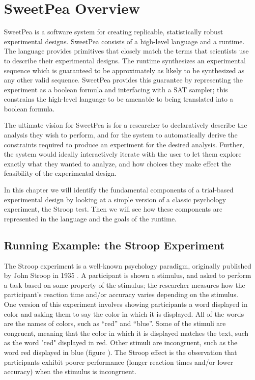 
\chapter{SweetPea Overview}

SweetPea is a software system for creating replicable, statistically robust experimental designs. SweetPea consists of a high-level language and a runtime. The language provides primitives that closely match the terms that scientists use to describe their experimental designs. The runtime synthesizes an experimental sequence which is guaranteed to be approximately as likely to be synthesized as any other valid sequence. SweetPea provides this guarantee by representing the experiment as a boolean formula and interfacing with a SAT sampler; this constrains the high-level language to be amenable to being translated into a boolean formula.

The ultimate vision for SweetPea is for a researcher to declaratively describe the analysis they wish to perform, and for the system to automatically derive the constraints required to produce an experiment for the desired analysis. Further, the system would ideally interactively iterate with the user to let them explore exactly what they wanted to analyze, and how choices they make effect the feasibility of the experimental design.

In this chapter we will identify the fundamental components of a trial-based experimental design by looking at a simple version of a classic psychology experiment, the Stroop test. Then we will see how these components are represented in the language and the goals of the runtime.

\section{Running Example: the Stroop Experiment}

The Stroop experiment is a well-known psychology paradigm, originally published by John Stroop in 1935 \cite{stroop1935studies}. A participant is shown a stimulus, and asked to perform a task based on some property of the stimulus; the researcher measures how the participant's reaction time and/or accuracy varies depending on the stimulus. One version of this experiment involves showing participants a word displayed in color and asking them to say the color in which it is displayed. All of the words are the names of colors, such as ``red'' and ``blue''. Some of the stimuli are congruent, meaning that the color in which it is displayed matches the text, such as the word "red" displayed in red. Other stimuli are incongruent, such as the word red displayed in blue (figure ). The Stroop effect is the observation that participants exhibit poorer performance (longer reaction times and/or lower accuracy) when the stimulus is incongruent.

